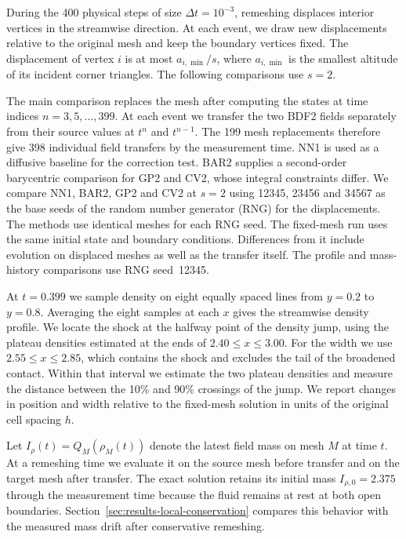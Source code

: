 \documentclass[a4paper,fleqn]{cas-sc}
\begin{document}
During the 400 physical steps of size $\Delta t=10^{-3}$, remeshing displaces interior vertices in the streamwise direction. At each event, we draw new displacements relative to the original mesh and keep the boundary vertices fixed. The displacement of vertex $i$ is at most $a_{i,\min}/s$, where $a_{i,\min}$ is the smallest altitude of its incident corner triangles. The following comparisons use $s=2$.

The main comparison replaces the mesh after computing the states at time indices $n=3,5,\ldots,399$. At each event we transfer the two BDF2 fields separately from their source values at $t^n$ and $t^{n-1}$. The 199 mesh replacements therefore give 398 individual field transfers by the measurement time. NN1 is used as a diffusive baseline for the correction test. BAR2 supplies a second-order barycentric comparison for GP2 and CV2, whose integral constraints differ. We compare NN1, BAR2, GP2 and CV2 at $s=2$ using 12345, 23456 and 34567 as the base seeds of the random number generator (RNG) for the displacements. The methods use identical meshes for each RNG seed. The fixed-mesh run uses the same initial state and boundary conditions. Differences from it include evolution on displaced meshes as well as the transfer itself. The profile and mass-history comparisons use RNG seed~12345.

At $t=0.399$ we sample density on eight equally spaced lines from $y=0.2$ to $y=0.8$. Averaging the eight samples at each $x$ gives the streamwise density profile. We locate the shock at the halfway point of the density jump, using the plateau densities estimated at the ends of $2.40\le x\le3.00$. For the width we use $2.55\le x\le2.85$, which contains the shock and excludes the tail of the broadened contact. Within that interval we estimate the two plateau densities and measure the distance between the 10\% and 90\% crossings of the jump. We report changes in position and width relative to the fixed-mesh solution in units of the original cell spacing $h$.

Let $I_\rho(t)=Q_{M}(\rho_{M}(t))$ denote the latest field mass on mesh $M$ at time $t$. At a remeshing time we evaluate it on the source mesh before transfer and on the target mesh after transfer. The exact solution retains its initial mass $I_{\rho,0}=2.375$ through the measurement time because the fluid remains at rest at both open boundaries. Section~\ref{sec:results-local-conservation} compares this behavior with the measured mass drift after conservative remeshing.
\end{document}
